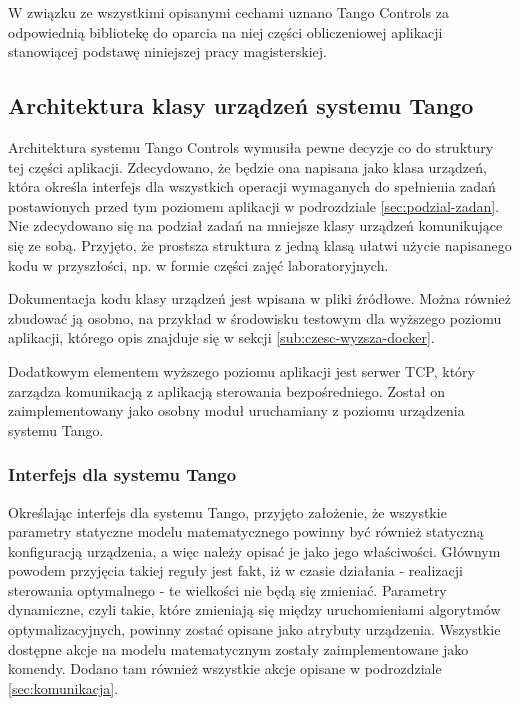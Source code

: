 W związku ze wszystkimi opisanymi cechami uznano Tango Controls za odpowiednią bibliotekę do oparcia na niej części obliczeniowej aplikacji stanowiącej podstawę niniejszej pracy magisterskiej.


\subsection{Architektura klasy urządzeń systemu Tango}
\label{sub:czesc-wyzsza-klasa}

Architektura systemu Tango Controls wymusiła pewne decyzje co do struktury tej części aplikacji. Zdecydowano, że będzie ona napisana jako klasa urządzeń, która określa interfejs dla wszystkich operacji wymaganych do spełnienia zadań postawionych przed tym poziomem aplikacji w podrozdziale \ref{sec:podzial-zadan}. Nie zdecydowano się na podział zadań na mniejsze klasy urządzeń komunikujące się ze sobą. Przyjęto, że prostsza struktura z jedną klasą ułatwi użycie napisanego kodu w przyszłości, np. w formie części zajęć laboratoryjnych.

Dokumentacja kodu klasy urządzeń jest wpisana w pliki źródłowe. Można również zbudować ją osobno, na przykład w środowisku testowym dla wyższego poziomu aplikacji, którego opis znajduje się w sekcji \ref{sub:czesc-wyzsza-docker}.

Dodatkowym elementem wyższego poziomu aplikacji jest serwer TCP, który zarządza komunikacją z aplikacją sterowania bezpośredniego. Został on zaimplementowany jako osobny moduł uruchamiany z poziomu urządzenia systemu Tango.

\subsubsection{Interfejs dla systemu Tango}

Określając interfejs dla systemu Tango, przyjęto założenie, że wszystkie parametry statyczne modelu matematycznego powinny być również statyczną konfiguracją urządzenia, a więc należy opisać je jako jego właściwości. Głównym powodem przyjęcia takiej reguły jest fakt, iż w czasie działania - realizacji sterowania optymalnego - te wielkości nie będą się zmieniać.
Parametry dynamiczne, czyli takie, które zmieniają się między uruchomieniami algorytmów optymalizacyjnych, powinny zostać opisane jako atrybuty urządzenia.
Wszystkie dostępne akcje na modelu matematycznym zostały zaimplementowane jako komendy. Dodano tam również wszystkie akcje opisane w podrozdziale \ref{sec:komunikacja}.


